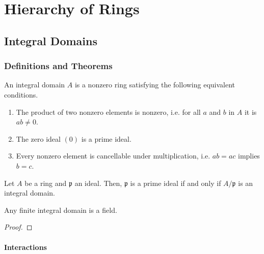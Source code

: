 \chapter{Hierarchy of Rings}

\newpage
\section{Integral Domains}
\subsection*{Definitions and Theorems}
\begin{defbox}
    \begin{definition}
        An integral domain \(A\) is a nonzero ring satisfying the following equivalent conditions.
        \begin{enumerate}
            \item The product of two nonzero elements is nonzero, i.e. for all \(a\) and \(b\) in \(A\) it is \(ab \neq 0\).
            \item The zero ideal \((0)\) is a prime ideal.
            \item Every nonzero element is cancellable under multiplication, i.e. \(ab = ac\) implies \(b = c\).
        \end{enumerate}
    \end{definition}
\end{defbox}

\begin{thmbox}
    \begin{lemma}
        Let \(A\) be a ring and \(\mathfrak{p}\) an ideal. Then, \(\mathfrak{p}\) is a prime ideal if and only if \(A / \mathfrak{p}\) is an integral domain.
    \end{lemma}
\end{thmbox}

\begin{thmbox}
    \begin{proposition}
        Any finite integral domain is a field.
    \end{proposition}
\end{thmbox}
\begin{proof}
    
\end{proof}

\subsubsection{Interactions}

